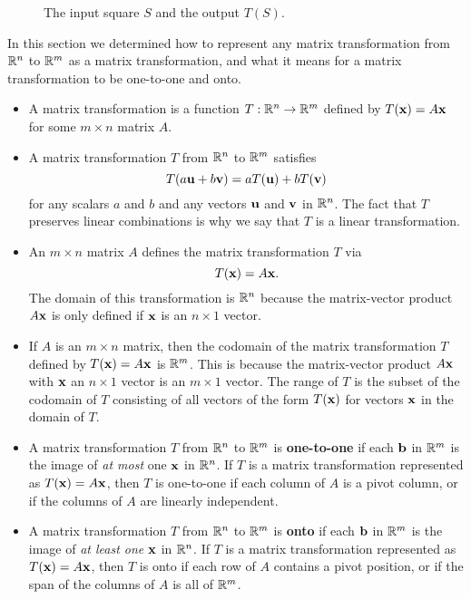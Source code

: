 \begin{example}
	\ea
\begin{figure}[ht]
\begin{center}
\caption{The input square $S$ and the output $T(S)$.}
\label{F:ex:1_g_polygons}
\end{center}
\end{figure}






\end{example}

\label{sec:mtx_trans_summ}

In this section we determined how to represent any matrix transformation from $\mathbb{R}^n$ to $\mathbb{R}^m$ as a matrix transformation, and what it means for a matrix transformation to be one-to-one and onto.
\begin{itemize}
\item A matrix transformation is a function $T: \mathbb{R}^n \to \mathbb{R}^m$ defined by $T(\mathbf{x}) = A\mathbf{x}$ for some $m \times n$ matrix $A$. 
\item A matrix transformation $T$ from $\mathbb{R}^n$ to $\mathbb{R}^m$ satisfies 
\[T(a\mathbf{u} + b\mathbf{v}) = aT(\mathbf{u}) + bT(\mathbf{v})\]
for any scalars $a$ and $b$ and any vectors $\mathbf{u}$ and $\mathbf{v}$ in $\mathbb{R}^n$. The fact that $T$ preserves linear combinations is why we say that $T$ is a linear transformation. 
\item An $m \times n$ matrix $A$ defines the matrix transformation $T$ via 
\[T(\mathbf{x}) = A \mathbf{x}.\]
The domain of this transformation is $\mathbb{R}^n$ because the matrix-vector product $A \mathbf{x}$ is only defined if $\mathbf{x}$ is an $n \times 1$ vector. 
\item If $A$ is an $m \times n$ matrix, then the codomain of the matrix transformation $T$ defined by $T(\mathbf{x}) = A \mathbf{x}$ is $\mathbb{R}^m$. This is because the matrix-vector product $A \mathbf{x}$ with $\mathbf{x}$ an $n \times 1$ vector is an $m \times 1$ vector. The range of $T$ is the subset of the codomain of $T$ consisting of all vectors of the form $T(\mathbf{x})$ for vectors $\mathbf{x}$ in the domain of $T$.
\item A matrix transformation $T$ from $\mathbb{R}^n$ to $\mathbb{R}^m$ is \textbf{one-to-one} if each $\mathbf{b}$ in $\mathbb{R}^m$ is the image of \emph{at most} one $\mathbf{x}$ in $\mathbb{R}^n$. If $T$ is a matrix transformation represented as $T(\mathbf{x}) = A\mathbf{x}$, then $T$ is one-to-one if each column of $A$ is a pivot column, or if the columns of $A$ are linearly independent.  
\item A matrix transformation $T$ from $\mathbb{R}^n$ to $\mathbb{R}^m$ is \textbf{onto} if each $\mathbf{b}$ in $\mathbb{R}^m$ is the image of \emph{at least one} $\mathbf{x}$ in $\mathbb{R}^n$. If $T$ is a matrix transformation represented as $T(\mathbf{x}) = A\mathbf{x}$, then $T$ is onto if each row of $A$ contains a pivot position, or if the span of the columns of $A$ is all of $\mathbb{R}^m$.
\end{itemize}




